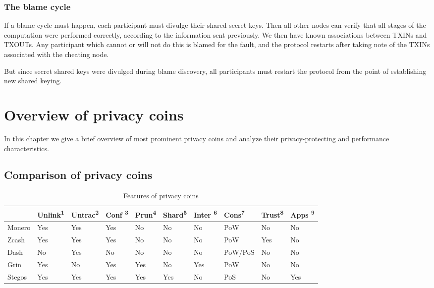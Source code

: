\documentclass[8pt,fleqn,openany]{book}
\begin{document}
{\subsection{The blame cycle} 
If a blame cycle must happen, each participant must divulge their shared secret keys. Then all other nodes can verify that all stages of the computation were performed correctly, according to the information sent previously. We then have known associations between TXINs and TXOUTs. Any participant which cannot or will not do this is blamed for the fault, and the protocol restarts after taking note of the TXINs associated with the cheating node.

But since secret shared keys were divulged during blame discovery, all participants must restart the protocol from the point of establishing new shared keying.

\chapter{Overview of privacy coins}\label{app:privacy-coins}

In this chapter we give a brief overview of most prominent privacy coins and analyze their privacy-protecting and performance characteristics.

\section{Comparison of privacy coins}

\begin{table}[ht!]
\centering
	\begin{tabular}{llllllllll}
	\toprule[2pt] 
	{} & Unlink\textsuperscript{1}
	 & Untrac\textsuperscript{2} & Conf \textsuperscript{3} & Prun\textsuperscript{4} & Shard\textsuperscript{5} & Inter \textsuperscript{6} & Cons\textsuperscript{7} & Trust\textsuperscript{8} & Apps \textsuperscript{9} \\
	\midrule[2pt]
	Monero & Yes & Yes & Yes & No & No & No & PoW & No & No \\
	Zcash  & Yes & Yes & Yes & No  & No & No & PoW & Yes & No \\
	Dash   & No  & Yes & No  & No  & No & No & PoW/PoS & No & No \\
	Grin   & Yes & No  & Yes & Yes & No & Yes & PoW & No & No \\
	Stegos & Yes & Yes & Yes & Yes & Yes & No & PoS & No  & Yes \\
	\bottomrule[2pt]
	\end{tabular}
\caption{Features of privacy coins} 
\end{table}

}
\end{document}
